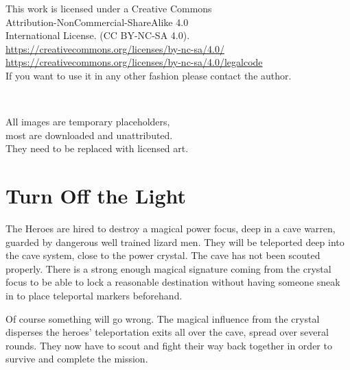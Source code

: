 \clearpage
\thispagestyle{empty}
\raggedbottom

\vsmall
\noindent
This work is licensed under a Creative Commons \\
Attribution-NonCommercial-ShareAlike 4.0 \\
International License. (CC BY-NC-SA 4.0).\\
\url{https://creativecommons.org/licenses/by-nc-sa/4.0/} \\
\url{https://creativecommons.org/licenses/by-nc-sa/4.0/legalcode} \\
If you want to use it in any other fashion please contact the author.

\

\noindent
All images are temporary placeholders, \\
most are downloaded and unattributed.\\
They need to be replaced with licensed art.

\normalsize






\cleardoublepage
\pagestyle{fancy}
\raggedbottom




\section*{Turn Off the Light}

The Heroes are hired to destroy a magical power focus, deep in a cave warren, guarded by dangerous well trained lizard men.
They will be teleported deep into the cave system, close to the power crystal. The cave has not been scouted properly. There is a strong enough magical signature coming from the crystal focus to be able to lock a reasonable destination without having someone sneak in to place teleportal markers beforehand.

Of course something will go wrong. The magical influence from the crystal disperses the heroes' teleportation exits all over the cave, spread over several rounds. They now have to scout and fight their way back together in order to survive and complete the mission.

